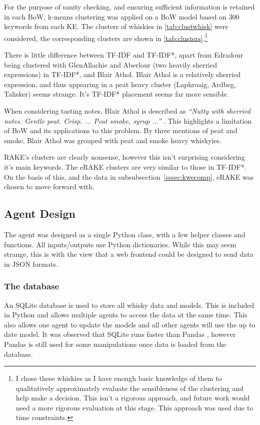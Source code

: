For the purpose of sanity checking, and ensuring sufficient information is retained in each BoW,
k-means clustering was applied on a BoW model based on 300 keywords from each KE. The clusters of whiskies in 
\autoref{tab:clustwhisk} were considered, the corresponding clusters are shown in \autoref{tab:clusters}.\footnote{I
chose these whiskies as I have enough basic knowledge of them to qualitatively approximately evaluate the sensibleness
of the clustering and help make a decision. This isn't a rigorous approach, and future work would need a more rigorous
evaluation at this stage.  This approach was used due to time constraints.}

There is little difference between TF-IDF and TF-IDF*, apart from Edradour being clustered with GlenAllachie and Aberlour 
(two heavily sherried expressions) in TF-IDF*, and Blair Athol.  Blair Athol is a relatively sherried expression,
and thus appearing in a peat heavy cluster (Laphroaig, Ardbeg, Talisker) seems strange. It's TF-IDF* placement
 seems far more sensible.

When considering tasting notes, Blair Athol is described as 
\emph{``Nutty with sherried notes. Gentle peat. Crisp. ... Peat smoke, syrup ...''} \cite{mom_ba}.  This highlights a limitation
of BoW and its applications to this problem. By three mentions of peat and smoke, Blair Athol was grouped
with peat and smoke heavy whiskyies.

RAKE's clusters are clearly nonsense, however this isn't surprising considering it's main keywords. The eRAKE clusters
are very similar to those in TF-IDF*.  On the basis of this, and the data in subsubsection~\ref{sssec:kwecomp}, eRAKE was
chosen to move forward with.

\subsection{Agent Design}\label{ssec:phase2}
The agent was designed as a single Python class, with a few helper classes and functions.  
All inputs/outputs use Python dictionaries.  While this may seem strange, this is with the view that a web frontend
could be designed to send data in JSON formats.

\subsubsection{The database}\label{sssec:db}
An SQLite database is used to store all whisky data and models.  This is included in Python and
allows multiple agents to access the data at the same time.  This also allows one agent to update the models
and all other agents will use the up to date model.  It was observed that SQLite runs faster than 
Pandas \cite{reback2020pandas}, however Pandas is still used 
for some manipulations once data is loaded from the database.

